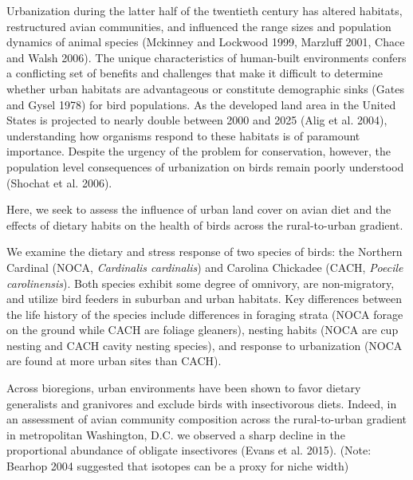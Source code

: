 \documentclass[12pt]{article}
\date{}
\begin{document}
\maketitle \vspace{-2cm}

\doublespace
{}\par
Urbanization during the latter half of the twentieth century has altered habitats, restructured avian communities, and influenced the range sizes and population dynamics of animal species (Mckinney and Lockwood 1999, Marzluff 2001, 
Chace and Walsh 2006). The unique characteristics of human-built environments confers a conflicting set of benefits and challenges that make it difficult to determine whether urban habitats are advantageous or constitute demographic 
sinks (Gates and Gysel 1978) for bird populations. As the developed land area in the United States is projected to nearly double between 2000 and 2025 (Alig et al. 2004), understanding how organisms respond to these habitats is of 
paramount importance. Despite the urgency of the problem for conservation, however, the population level consequences of urbanization on birds remain poorly understood (Shochat et al. 2006). \par

\par
Here, we seek to assess the influence of urban land cover on avian diet and the effects of dietary habits on the health of birds across the rural-to-urban gradient.

\par
We examine the dietary and stress response of two species of birds: the Northern Cardinal (NOCA, \textit{Cardinalis cardinalis}) and Carolina Chickadee (CACH, \textit{Poecile carolinensis}). Both species exhibit some degree of omnivory, 
are non-migratory, and utilize bird feeders in suburban and urban habitats. Key differences between the life history of the species include differences in foraging strata (NOCA forage on the ground while CACH are foliage gleaners), 
nesting habits (NOCA are cup nesting and CACH cavity nesting species), and response to urbanization (NOCA are found at more urban sites than CACH).

 \par
Across bioregions, urban environments have been shown to favor dietary generalists and granivores and exclude birds with insectivorous diets. Indeed, in an assessment of avian community composition across the rural-to-urban gradient in 
metropolitan Washington, D.C. we observed a sharp decline in the proportional abundance of obligate insectivores (Evans et al. 2015). (Note: Bearhop 2004 suggested that isotopes can be a proxy for niche width)\\
\end{document}
